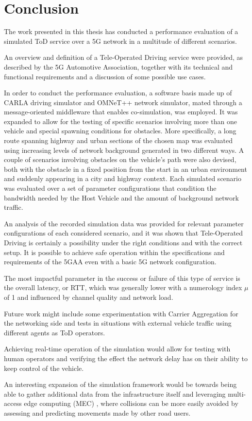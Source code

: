 {}  
\chapter*{Conclusion}
\pagestyle{plain}
The work presented in this thesis has conducted a performance evaluation of a simulated ToD service over a 5G network in a multitude of different scenarios.

An overview and definition of a Tele-Operated Driving service were provided, as described by the 5G Automotive Association, together with its technical and functional requirements and a discussion of some possible use cases.

In order to conduct the performance evaluation, a software basis made up of CARLA driving simulator and OMNeT++ network simulator, mated through a message-oriented middleware that enables co-simulation, was employed. It was expanded to allow for the testing of specific scenarios involving more than one vehicle and special spawning conditions for obstacles.
More specifically, a long route spanning highway and urban sections of the chosen map was evaluated
using increasing levels of network background generated in two different ways. A couple of scenarios involving obstacles on the vehicle's path were also devised, both with the obstacle in a fixed position from the start in an urban environment and suddenly appearing in a city and highway context.
Each simulated scenario was evaluated over a set of parameter configurations that condition the bandwidth needed by the Host Vehicle and the amount of background network traffic.

An analysis of the recorded simulation data was provided for relevant parameter configurations of each considered scenario, and it was shown that Tele-Operated Driving is certainly a possibility under the right conditions and with the correct setup. It is possible to achieve safe operation within the specifications and requirements of the 5GAA even with a basic 5G network configuration.

The most impactful parameter in the success or failure of this type of service is the overall latency, or RTT, which was generally lower with a numerology index $\mu$ of 1 and influenced by channel quality and network load.

Future work might include some experimentation with Carrier Aggregation for the networking side and tests in situations with external vehicle traffic using different agents as ToD operators.

Achieving real-time operation of the simulation would allow for testing with human operators and verifying the effect the network delay has on their ability to keep control of the vehicle.

An interesting expansion of the simulation framework would be towards being able to gather additional data from the infrastructure itself and leveraging multi-access edge computing (MEC) \cite{mec_collision_avoidance}, where collisions can be more easily avoided by assessing and predicting movements made by other road users.
